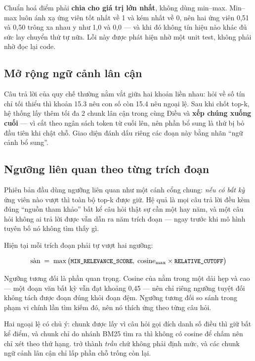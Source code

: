 \begin{notebox}[title={Chi tiết dễ sai}]
Chuẩn hoá điểm phải \textbf{chia cho giá trị lớn nhất}, không dùng min–max. Min–max luôn ánh xạ
ứng viên tốt nhất về 1 và kém nhất về 0, nên hai ứng viên 0,51 và 0,50 trông xa nhau y như 1,0
và 0,0 — và khi đó không tín hiệu nào khác đủ sức lay chuyển thứ tự nữa. Lỗi này được phát hiện
nhờ một unit test, không phải nhờ đọc lại code.
\end{notebox}

\subsection{Mở rộng ngữ cảnh lân cận}

Câu trả lời của quy chế thường nằm vắt giữa hai khoản liền nhau: hỏi về số tín chỉ tối thiểu
thì khoản 15.3 nêu con số còn 15.4 nêu ngoại lệ. Sau khi chốt top-k, hệ thống lấy thêm tối đa 2
chunk lân cận trong cùng Điều và \textbf{xếp chúng xuống cuối} — vì  cắt
theo ngân sách token từ cuối lên, nên phần bổ sung là thứ bị bỏ đầu tiên khi chật chỗ. Giao
diện đánh dấu riêng các đoạn này bằng nhãn “ngữ cảnh bổ sung”.

\subsection{Ngưỡng liên quan theo từng trích đoạn}
\label{sec:nguong}

Phiên bản đầu dùng ngưỡng liên quan như một cánh cổng chung: \emph{nếu có bất kỳ} ứng viên nào
vượt  thì toàn bộ top-k được giữ. Hệ quả là mọi câu trả lời đều kèm
đúng  “nguồn tham khảo” bất kể câu hỏi thật sự cần một hay năm, và một câu
hỏi không ai trả lời được vẫn dẫn ra năm trích đoạn — ngay trước khi mô hình tuyên bố nó không
tìm thấy gì.

Hiện tại mỗi trích đoạn phải tự vượt hai ngưỡng:

\[
\text{sàn} \;=\; \max\big(\text{{\ttfamily\small MIN\_RELEVANCE\_SCORE}},\;
\text{cosine}_{\max} \times \text{{\ttfamily\small RELATIVE\_CUTOFF}}\big)
\]

Ngưỡng tương đối là phần quan trọng. Cosine của  nằm trong một dải hẹp và cao —
một đoạn văn bất kỳ vẫn đạt khoảng 0,45 — nên chỉ riêng ngưỡng tuyệt đối không tách được đoạn
đúng khỏi đoạn đệm. Ngưỡng tương đối so sánh trong phạm vi chính lần tìm kiếm đó, nên nó thích
ứng theo từng câu hỏi.

Hai ngoại lệ có chủ ý: chunk được lấy vì câu hỏi gọi đích danh số điều thì giữ bất kể điểm, và
chunk chỉ do nhánh BM25 tìm ra thì không có cosine để chấm nên chỉ xét theo thứ hạng.
 trở thành \emph{trần} chứ không phải định mức, và các chunk ngữ cảnh lân
cận chỉ lấp phần chỗ trống còn lại.

